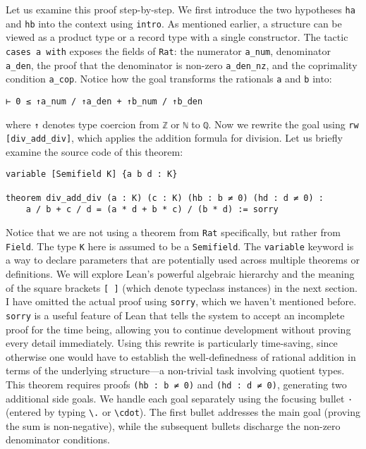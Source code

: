 Let us examine this proof step-by-step.
We first introduce the two hypotheses \lstinline[language=lean]|ha| and \lstinline[language=lean]|hb| into the context using \lstinline[language=lean]|intro|. As mentioned earlier, a structure can be viewed as a product type or a record type with a single constructor. The tactic \lstinline[language=lean]|cases a with| exposes the fields of \lstinline[language=lean]|Rat|: the numerator \lstinline[language=lean]|a_num|, denominator \lstinline[language=lean]|a_den|, the proof that the denominator is non-zero \lstinline[language=lean]|a_den_nz|, and the coprimality condition \lstinline[language=lean]|a_cop|. Notice how the goal transforms the rationals \lstinline[language=lean]|a| and \lstinline[language=lean]|b| into:
\begin{lstlisting}[language=lean]
⊢ 0 ≤ ↑a_num / ↑a_den + ↑b_num / ↑b_den
\end{lstlisting}
where \lstinline[language=lean]|↑| denotes type coercion from \lstinline[language=lean]|ℤ| or \lstinline[language=lean]|ℕ| to \lstinline[language=lean]|ℚ|.
Now we rewrite the goal using \lstinline[language=lean]|rw [div_add_div]|, which applies the addition formula for division.
Let us briefly examine the source code of this theorem:
\begin{lstlisting}[language=lean]
variable [Semifield K] {a b d : K}

theorem div_add_div (a : K) (c : K) (hb : b ≠ 0) (hd : d ≠ 0) :
    a / b + c / d = (a * d + b * c) / (b * d) := sorry
\end{lstlisting}
Notice that we are not using a theorem from \lstinline[language=lean]|Rat| specifically, but rather from \lstinline[language=lean]|Field|. The type \lstinline[language=lean]|K| here is assumed to be a \lstinline[language=lean]|Semifield|. The \lstinline[language=lean]|variable| keyword is a way to declare parameters that are potentially used across multiple theorems or definitions. We will explore Lean's powerful algebraic hierarchy and the meaning of the square brackets \lstinline[language=lean]|[ ]| (which denote typeclass instances) in the next section.
I have omitted the actual proof using \lstinline[language=lean]|sorry|, which we haven't mentioned before. \lstinline[language=lean]|sorry| is a useful feature of Lean that tells the system to accept an incomplete proof for the time being, allowing you to continue development without proving every detail immediately. Using this rewrite is particularly time-saving, since otherwise one would have to establish the well-definedness of rational addition in terms of the underlying structure---a non-trivial task involving quotient types.
This theorem requires proofs \lstinline[language=lean]|(hb : b ≠ 0)| and \lstinline[language=lean]|(hd : d ≠ 0)|, generating two additional side goals. We handle each goal separately using the focusing bullet \lstinline[language=lean]|·| (entered by typing \texttt{\textbackslash.} or \texttt{\textbackslash cdot}). The first bullet addresses the main goal (proving the sum is non-negative), while the subsequent bullets discharge the non-zero denominator conditions.

